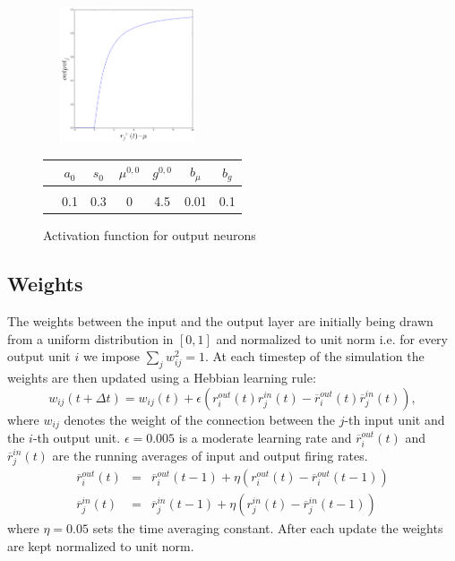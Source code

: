 \documentclass[a4paper, 12pt]{article}
\begin{document}
\begin{figure}[h]
\setlength{\abovecaptionskip}{5pt}
\setlength{\belowcaptionskip}{0pt}	
	\begin{minipage}[t]{0.5\textwidth}\vspace{0pt}
	\includegraphics[width=5cm, height=4cm]{pics/output_function.png}
	\caption{\footnotesize{Activation function for output neurons}}
	\end{minipage}
\hfill
	\begin{minipage}[t]{0.5\textwidth}\vspace{20pt}
	\begin{tabular}{c|cccccc}
	& $a_0$ & $s_0$ & $\mu^{0,0}$ & $g^{0,0}$ & $b_\mu$ & $b_g$\\
	\hline\\
	& 0.1 & 0.3 & 0 & 4.5 & 0.01 & 0.1\\
	\end{tabular}
	\end{minipage}
\end{figure}	
%
%
%
\subsection{Weights}
The weights between the input and the output layer are initially being drawn from a uniform distribution in $[0,1]$ and normalized to unit norm i.e. for every output unit $i$ we impose $\sum_jw^2_{ij}=1$. At each timestep of the simulation the weights are then updated using a Hebbian learning rule:  
\begin{equation}
w_{ij}(t+\Delta t)= w_{ij}(t)+ \epsilon(r_i^{out}(t)r_j^{in}(t)-\overline{r}_i^{out}(t)\overline{r}_j^{in}(t)),
\end{equation}
where $w_{ij}$ denotes the weight of the connection between the $j$-th input unit and the $i$-th output unit. $\epsilon= 0.005$ is a moderate learning rate and $\overline{r}_i^{out}(t)$ and $\overline{r}_j^{in}(t)$ are the  running averages of input and output firing rates.  
	\begin{eqnarray}
	\overline{r}_i^{out}(t) &=& \overline{r}_i^{out}(t-1)+ \eta(r_i^{out}(t)-\overline{r}_i^{out}(t-1))\\
	\overline{r}_j^{in}(t) &=& \overline{r}_j^{in}(t-1)+ \eta(r_j^{in}(t)-\overline{r}_j^{in}(t-1))
	\end{eqnarray}
where $\eta=0.05$ sets the time averaging constant. After each update the weights are kept normalized to unit norm. 
%
%
\end{document}
